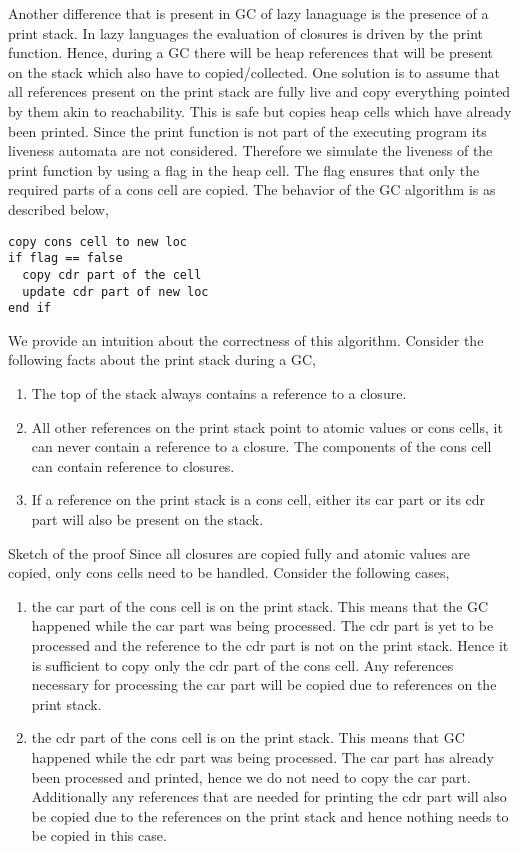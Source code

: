\documentclass[10pt]{sigplanconf}
\begin{document}
Another  difference that is  present in  GC of  lazy lanaguage  is the
presence  of  a print  stack.  In  lazy  languages the  evaluation  of
closures is  driven by  the print function.  Hence, during a  GC there
will be heap  references that will be present on  the stack which also
have  to  copied/collected.  One   solution  is  to  assume  that  all
references  present  on  the  print  stack are  fully  live  and  copy
everything  pointed by  them akin  to reachability.  This is  safe but
copies heap  cells which  have already been  printed. Since  the print
function is  not part of  the executing program its  liveness automata
are not  considered. Therefore we  simulate the liveness of  the print
function by using a flag in  the heap cell. The flag ensures that only
the required parts  of a cons cell are copied. The  behavior of the GC
algorithm is as described below,
\begin{verbatim}
copy cons cell to new loc
if flag == false
  copy cdr part of the cell
  update cdr part of new loc
end if
\end{verbatim}
We   provide   an   intuition    about   the   correctness   of   this
algorithm. Consider the following facts about the print stack during a
GC,
\begin{enumerate}
\item The top of the stack always contains a reference to a closure.
\item All other references on the print stack point to atomic values or cons cells, it can never contain a
reference to a closure. The components of the cons cell can contain reference to closures.
\item If a reference on the print stack is a cons cell, either its car part or its cdr part will also be 
present on the stack.
\end{enumerate}
Sketch of the proof
Since all closures are copied fully and atomic values are copied, only cons cells need to be handled. 
Consider the following cases,
\begin{enumerate}
\item the car part of the cons cell is on the print stack. This means that the GC happened while 
the car part was being processed. The cdr part is yet to be processed and the reference to the cdr part 
is not on the print stack. Hence it is sufficient to copy only the cdr part of the cons cell. Any references 
necessary for processing the car part will be copied due to references on the print stack.
\item the cdr part of the cons cell is on the print stack. This means that GC happened while 
the cdr part was being processed.  The car part has already been processed and printed, hence we do not 
need to copy the car part. Additionally any references that are needed for printing the cdr part will 
also be copied due to the references on the print stack and hence nothing needs to be copied in this case.
\end{enumerate}
\end{document}
